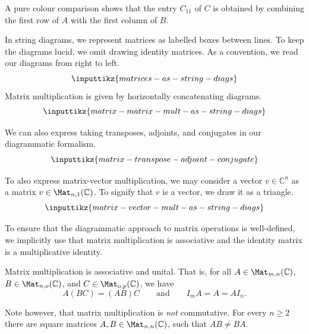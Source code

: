 \documentclass[a4paper,oneside, 12pt]{amsart}
\begin{document}
A pure colour comparison shows that \eg the entry \(C_{11}\) of \(C\) is obtained by combining the first row of \(A\) with the first column of \(B\).

\begin{notation}\label{not:string-diags-for-matrices}
  In string diagrams, we represent matrices as labelled boxes between lines.
  To keep the diagrams lucid, we omit drawing identity matrices.
  As a convention, we read our diagrams from right to left.
  \begin{equation}
    \inputtikz{matrices-as-string-diags}
  \end{equation}
  Matrix multiplication is given by horizontally concatenating diagrams.
  \begin{equation}
    \inputtikz{matrix-matrix-mult-as-string-diags}
  \end{equation}

  We can also express taking transposes, adjoints, and conjugates in our diagrammatic formalism.
  \begin{equation}
    \inputtikz{matrix-transpose-adjoint-conjugate}
  \end{equation}

  To also express matrix-vector multiplication, we may consider a vector \(v \in \mathbb{C}^{n}\) as a matrix \(v\in \Mat_{n,1}( \mathbb{C})\).
  To signify that \(v\) is a vector, we draw it as a triangle.
  \begin{equation}
    \inputtikz{matrix-vector-mult-as-string-diags}
  \end{equation}
\end{notation}

To ensure that the diagrammatic approach to matrix operations is well-defined, we implicitly use that matrix multiplication is associative and the identity matrix is a multiplicative identity.

\begin{lemma}\label{lem:associativity-of-matrix-multiplication}
  Matrix multiplication is associative and unital.
  That is, for all \(A \in \Mat_{m,n}( \mathbb{C})\), \(B \in \Mat_{n,o}( \mathbb{C})\), and \( C \in \Mat_{o,p}( \mathbb{C})\), we have
  \begin{equation*}
    A(BC) = (AB)C \qquad \text{and}\qquad
    I_{m} A = A = A I_{n}.
  \end{equation*}
\end{lemma}
Note however, that matrix multiplication is \emph{not} commutative.
For every \(n\geq 2\) there are square matrices \(A, B \in \Mat_{n,n}(\mathbb{C})\), such that \(AB \neq BA\).
\end{document}
